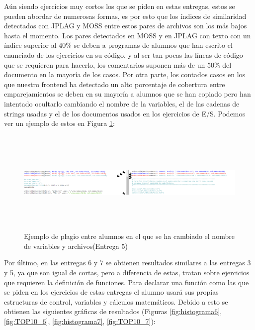 Aún siendo ejercicios muy cortos los que se piden en estas entregas, estos se pueden abordar de numerosas formas, es por esto que los índices de similaridad detectados con JPLAG y MOSS entre estos pares de archivos son los más bajos hasta el momento.
\newline
Los pares detectados en MOSS y en JPLAG con texto con un índice superior al 40\% se deben a programas de alumnos que han escrito el enunciado de los ejercicios en su código, y al ser tan pocas las líneas de código que se requieren para hacerlo, los comentarios suponen más de un 50\% del documento en la mayoría de los casos.
\newline
Por otra parte, los contados casos en los que nuestro frontend ha detectado un alto porcentaje de cobertura entre emparejamientos se deben en su mayoría a alumnos que se han copiado pero han intentado ocultarlo cambiando el nombre de la variables, el de las cadenas de strings usadas y el de los documentos usados en los ejercicios de E/S.
Podemos ver un ejemplo de estos en Figura \ref{fig:ENTREGA5_variable}:


\begin{figure}[H] %
\centering
\includegraphics[width=15cm, height=5cm]{imagenes/ENTREGA5_variable.png}  %
\caption{Ejemplo de plagio entre alumnos en el que se ha cambiado el nombre de variables y archivos(Entrega 5)} \label{fig:ENTREGA5_variable}
\end{figure}

\bigskip
Por último, en las entregas 6 y 7 se obtienen resultados similares a las entregas 3 y 5, ya que son igual de cortas, pero a diferencia de estas, tratan sobre ejercicios que requieren la definición de funciones. 
\newline
Para declarar una función como las que se piden en los ejercicios de estas entregas el alumno usará sus propias estructuras de control, variables y cálculos matemáticos.
\newline
Debido a esto se obtienen las siguientes gráficas de resultados (Figuras \ref{fig:histograma6}, \ref{fig:TOP10_6}, \ref{fig:histograma7}, \ref{fig:TOP10_7}):



